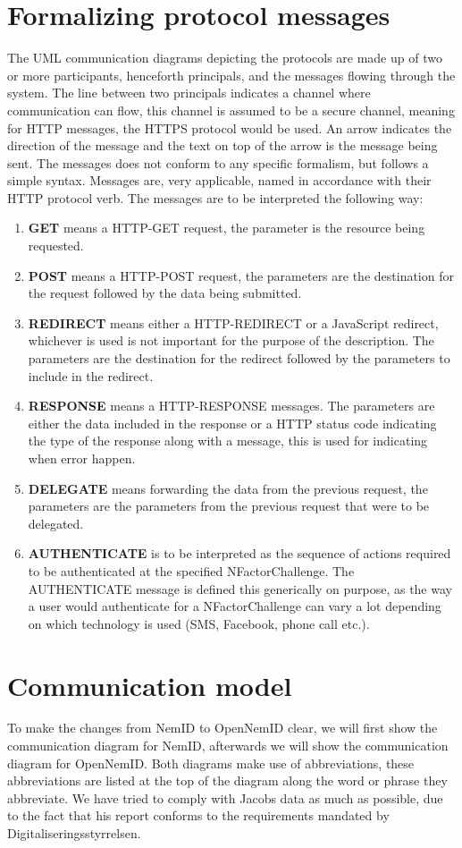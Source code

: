 \documentclass[twosided]{report}
\begin{document}
\section{Formalizing protocol messages}
The UML communication diagrams depicting the protocols are made up of two or more participants, henceforth principals, and the messages flowing through the system. The line between two principals indicates a channel where communication can flow, this channel is assumed to be a secure channel, meaning for HTTP messages, the HTTPS protocol would be used. An arrow indicates the direction of the message and the text on top of the arrow is the message being sent. The messages does not conform to any specific formalism, but follows a simple syntax. Messages are, very applicable, named in accordance with their HTTP protocol verb. The messages are to be interpreted the following way:
\begin{enumerate}
	\item[] \textbf{GET} means a HTTP-GET request, the parameter is the resource being requested.
	\item[] \textbf{POST} means a HTTP-POST request, the parameters are the destination for the request followed by the data being submitted.
	\item[] \textbf{REDIRECT} means either a HTTP-REDIRECT or a JavaScript redirect, whichever is used is not important for the purpose of the description. The parameters are the destination for the redirect followed by the parameters to include in the redirect.
	\item[] \textbf{RESPONSE} means a HTTP-RESPONSE messages. The parameters are either the data included in the response or a HTTP status code indicating the type of the response along with a message, this is used for indicating when error happen.
	\item[] \textbf{DELEGATE} means forwarding the data from the previous request, the parameters are the parameters from the previous request that were to be delegated.
	\item[] \textbf{AUTHENTICATE} is to be interpreted as the sequence of actions required to be authenticated at the specified NFactorChallenge. The AUTHENTICATE message is defined this generically on purpose, as the way a user would authenticate for a NFactorChallenge can vary a lot depending on which technology is used (SMS, Facebook, phone call etc.).
\end{enumerate}

\section{Communication model}
To make the changes from NemID to OpenNemID clear, we will first show the communication diagram for NemID, afterwards we will show the communication diagram for OpenNemID. Both diagrams make use of abbreviations, these abbreviations are listed at the top of the diagram along the word or phrase they abbreviate. We have tried to comply with Jacobs data as much as possible, due to the fact that his report conforms to the requirements mandated by Digitaliseringsstyrrelsen.
\end{document}
